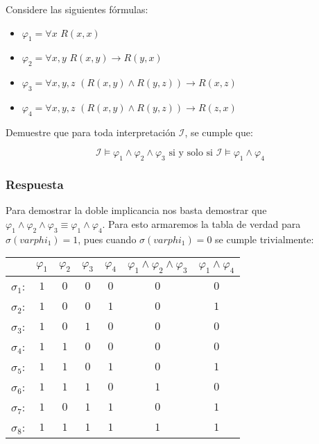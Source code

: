 
Considere las siguientes fórmulas:

\begin{itemize}
  \item $\varphi_1 = \forall x$ $R(x,x)$
  \item $\varphi_2 = \forall x,y$ $R(x,y) \rightarrow R(y,x)$
  \item $\varphi_3 = \forall x,y,z$ $(R(x,y) \wedge R(y,z)) \rightarrow R(x,z)$
  \item $\varphi_4 = \forall x,y,z$ $(R(x,y) \wedge R(y,z)) \rightarrow R(z,x)$
\end{itemize}

Demuestre que para toda interpretación $\mathcal{I}$, se cumple que:

  \[ \mathcal{I} \vDash \varphi_1 \wedge \varphi_2 \wedge \varphi_3 
  \text{ si y solo si } \mathcal{I} \vDash \varphi_1 \wedge \varphi_4 \]

\subsubsection*{Respuesta}

Para demostrar la doble implicancia nos basta demostrar que $\varphi_1 \wedge \varphi_2 \wedge \varphi_3 \equiv \varphi_1 \wedge \varphi_4$.
Para esto armaremos la tabla de verdad para $\sigma (varphi_1) = 1$, pues cuando $\sigma (varphi_1) = 0$ se cumple trivialmente:

 \begin{center}
    \begin{tabular}{c|c|c|c|c|c|c}
         & $\varphi_1$ & $\varphi_2$ & $\varphi_3$ & $\varphi_4$ & $\varphi_1 \wedge \varphi_2 \wedge \varphi_3$ & $\varphi_1 \wedge \varphi_4$\\
        \hline
        $\sigma_1$: & $1$ & $0$ & $0$ & $0$ & $0$ & $0$ \\
        $\sigma_2$: & $1$ & $0$ & $0$ & $1$ & $0$ & $1$ \\
        $\sigma_3$: & $1$ & $0$ & $1$ & $0$ & $0$ & $0$ \\
        $\sigma_4$: & $1$ & $1$ & $0$ & $0$ & $0$ & $0$ \\
        $\sigma_5$: & $1$ & $1$ & $0$ & $1$ & $0$ & $1$ \\
        $\sigma_6$: & $1$ & $1$ & $1$ & $0$ & $1$ & $0$ \\
        $\sigma_7$: & $1$ & $0$ & $1$ & $1$ & $0$ & $1$ \\
        $\sigma_8$: & $1$ & $1$ & $1$ & $1$ & $1$ & $1$ \\
    \end{tabular}
\end{center}

